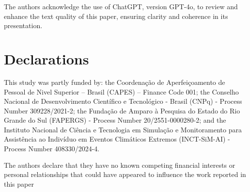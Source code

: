 \documentclass[pdflatex,sn-mathphys-num]{sn-jnl}%
\theoremstyle{thmstyleone}%
\theoremstyle{thmstyletwo}%
\theoremstyle{thmstylethree}%
\begin{document}
\backmatter

The authors acknowledge the use of ChatGPT, version GPT-4o, to review and enhance the text quality of this paper, ensuring clarity and coherence in its presentation.
    
\section*{Declarations}


This study was partly funded by: the Coordenação de Aperfeiçoamento de Pessoal de Nivel Superior – Brasil (CAPES) – Finance Code 001; the Conselho Nacional de Desenvolvimento Científico e Tecnológico - Brasil (CNPq) - Process Number 309228/2021-2; the Fundação de Amparo à Pesquisa do Estado do Rio Grande do Sul (FAPERGS) - Process Number 20/2551-0000280-2; and the Instituto Nacional de Ciência e Tecnologia em
Simulação e Monitoramento para Assistência ao
Indivíduo em Eventos Climáticos Extremos (INCT-SiM-AI) - Process Number 408330/2024-4.

The authors declare that they have no known competing financial interests or personal relationships that could have appeared to
influence the work reported in this paper
\end{document}
